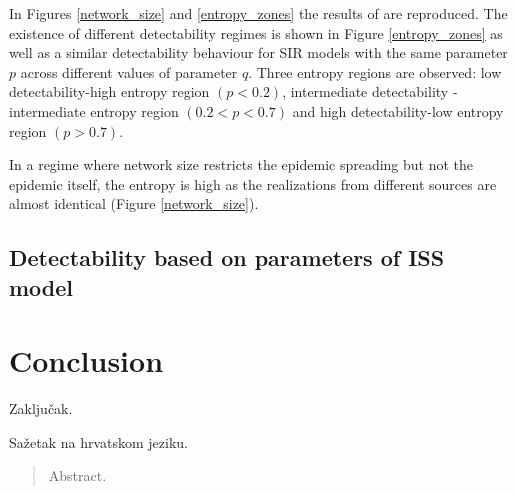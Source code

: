 \documentclass[times, utf8, diplomski]{fer}
\begin{document}
In Figures \ref{network_size} and \ref{entropy_zones} the results of \cite{Nino} are reproduced. The existence of different detectability regimes is shown in Figure \ref{entropy_zones} as well as a similar detectability behaviour for SIR models with the same parameter $p$ across different values of parameter $q$.  Three entropy regions are observed: low detectability-high entropy region $(p < 0.2)$, intermediate detectability - intermediate entropy region $(0.2 < p < 0.7)$ and high detectability-low entropy region $(p > 0.7)$.

In a regime where network size restricts the epidemic spreading but not the epidemic itself, the entropy is high as the realizations from different sources are almost identical (Figure \ref{network_size}).

\section{Detectability based on parameters of ISS model}



\chapter{Conclusion}
Zaključak.




\begin{sazetak}
Sažetak na hrvatskom jeziku.

\end{sazetak}

\begin{abstract}
Abstract.

\end{abstract}
\end{document}
